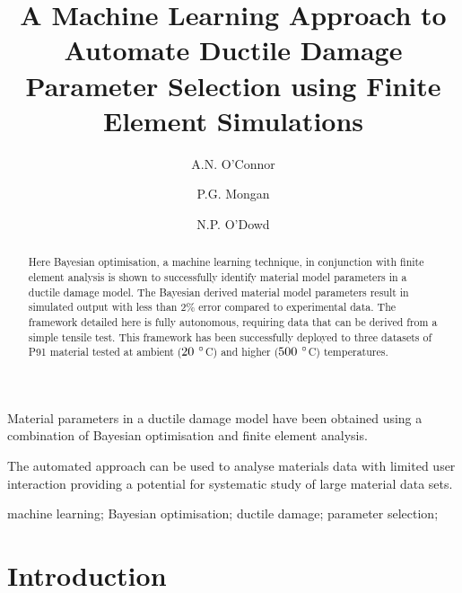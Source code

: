 \documentclass[preprint, review, 12pt]{elsarticle}
\begin{document}
	\begin{frontmatter}


		\title{A Machine Learning Approach to Automate Ductile Damage Parameter Selection using Finite Element Simulations}

		\author[1,2]{A.N. O'Connor}
		\author[1,3]{P.G. Mongan}
		\author[1,2,3]{N.P. O'Dowd}

		\address[1]{School of Engineering, University of Limerick, Ireland}
		\address[2]{Bernal Institute, University of Limerick, Ireland}
		\address[3]{Confirm Smart Manufacturing Research Centre, Ireland}

		\begin{abstract}

			Here Bayesian optimisation, a machine learning technique, in conjunction with finite element analysis is shown to successfully identify material model parameters in a ductile damage model.
			The Bayesian derived material model parameters result in simulated output with less than 2\% error compared to experimental data.
			The framework detailed here is fully autonomous, requiring data that can be derived from a simple tensile test.
			This framework has been successfully deployed to three datasets of P91 material tested at ambient ($20~\degree$C) and higher ($500~\degree$C) temperatures.
		\end{abstract}

		\begin{highlights}
			\item Material parameters in a ductile damage model have been obtained using a combination of Bayesian optimisation and finite element analysis.
			\item The automated approach can be used to analyse materials data with limited user interaction providing a potential for systematic study of large material data sets.
		\end{highlights}

		\begin{keyword}
			machine learning;
			Bayesian optimisation;
			ductile damage;
			parameter selection;
		\end{keyword}

	\end{frontmatter}

	\section{Introduction}
	\label{h:introduction}
\end{document}
